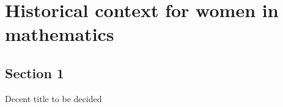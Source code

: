 \chapter{Historical context for women in mathematics}\label{chap:lorem}

\section{Section 1}

Decent title to be decided 